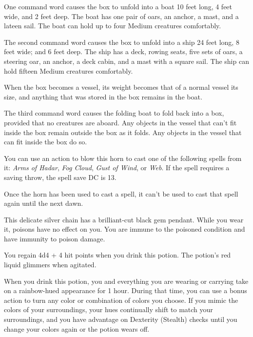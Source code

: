 \documentclass[10pt,a4paper,twoside,bg=print,twocolumn,openany,nodeprecatedcode]{dndbook}
\begin{document}
One command word causes the box to unfold into a boat 10 feet long, 4 feet wide, and 2 feet deep. The boat has one pair of oars, an anchor, a mast, and a lateen sail. The boat can hold up to four Medium creatures comfortably.

The second command word causes the box to unfold into a ship 24 feet long, 8 feet wide; and 6 feet deep. The ship has a deck, rowing seats, five sets of oars, a steering oar, an anchor, a deck cabin, and a mast with a square sail. The ship can hold fifteen Medium creatures comfortably.

When the box becomes a vessel, its weight becomes that of a normal vessel its size, and anything that was stored in the box remains in the boat.

The third command word causes the folding boat to fold back into a box, provided that no creatures are aboard. Any objects in the vessel that can't fit inside the box remain outside the box as it folds. Any objects in the vessel that can fit inside the box do so.

You can use an action to blow this horn to cast one of the following spells from it: \textit{Arms of Hadar}, \textit{Fog Cloud}, \textit{Gust of Wind}, or \textit{Web}. If the spell requires a saving throw, the spell save DC is 13.

Once the horn has been used to cast a spell, it can't be used to cast that spell again until the next dawn.

This delicate silver chain has a brilliant-cut black gem pendant. While you wear it, poisons have no effect on you. You are immune to the poisoned condition and have immunity to poison damage.

You regain 4d4 + 4 hit points when you drink this potion. The potion's red liquid glimmers when agitated.

When you drink this potion, you and everything you are wearing or carrying take on a rainbow-hued appearance for 1 hour. During that time, you can use a bonus action to turn any color or combination of colors you choose. If you mimic the colors of your surroundings, your hues continually shift to match your surroundings, and you have advantage on Dexterity (Stealth) checks until you change your colors again or the potion wears off.
\end{document}
